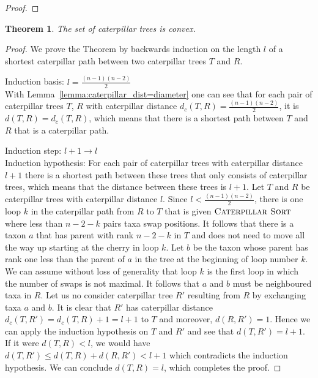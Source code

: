 \documentclass{amsart}
\newcommand{\csort}{\textsc{Caterpillar Sort}}
\newtheorem{theorem}[definition]{Theorem}
\begin{document}
\begin{proof}
\end{proof}

\begin{theorem}
    The set of caterpillar trees is convex.
    \label{thm:caterpillar_convex}
\end{theorem}

\begin{proof}
    We prove the Theorem by backwards induction on the length $l$ of a shortest caterpillar path between two caterpillar trees $T$ and $R$.

    Induction basis: $l = \frac{(n-1)(n-2)}{2}$\\
    With Lemma~\ref{lemma:caterpillar_dist=diameter} one can see that for each pair of caterpillar trees $T$, $R$ with caterpillar distance $d_c(T,R) = \frac{(n-1)(n-2)}{2}$, it is $d(T,R) = d_c(T,R)$, which means that there is a shortest path between $T$ and $R$ that is a caterpillar path.

    Induction step: $l+1 \to l$\\
    Induction hypothesis: For each pair of caterpillar trees with caterpillar distance $l+1$ there is a shortest path between these trees that only consists of caterpillar trees, which means that the distance between these trees is $l+1$.
    Let $T$ and $R$ be caterpillar trees with caterpillar distance $l$.
    Since $l < \frac{(n-1)(n-2)}{2}$, there is one loop $k$ in the caterpillar path from $R$ to $T$ that is given $\csort$ where less than $n-2-k$ pairs taxa swap positions.
    It follows that there is a taxon $a$ that has parent with rank $n-2-k$ in $T$ and does not need to move all the way up starting at the cherry in loop $k$.
    Let $b$ be the taxon whose parent has rank one less than the parent of $a$ in the tree at the beginning of loop number $k$.
    We can assume without loss of generality that loop $k$ is the first loop in which the number of swaps is not maximal.
    It follows that $a$ and $b$ must be neighboured taxa in $R$.
    Let us no consider caterpillar tree $R'$ resulting from $R$ by exchanging taxa $a$ and $b$.
    It is clear that $R'$ has caterpillar distance $d_c(T,R') = d_c(T,R) + 1 = l+1$ to $T$ and moreover, $d(R,R') = 1$.
    Hence we can apply the induction hypothesis on $T$ and $R'$ and see that $d(T,R') = l+1$.
    If it were $d(T,R) < l$, we would have $d(T,R') \leq d(T,R) + d(R,R') < l + 1$ which contradicts the induction hypothesis.
    We can conclude $d(T,R) = l$, which completes the proof.
\end{proof}
\end{document}
